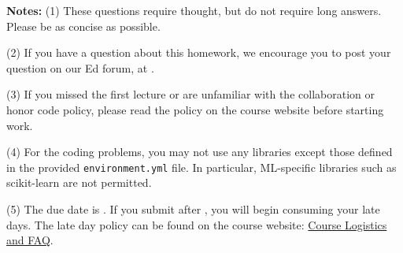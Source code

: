 {\bf Notes:} 
(1) These questions require thought, but do not require long
answers. Please be as concise as possible.  

(2) If you have a question
about this homework, we encourage you to post your question on our
Ed forum, at \edstem. 

(3) If you
missed the first lecture or are unfamiliar with the collaboration or honor
code policy, please read the policy on the course website before starting work.

(4) For the coding problems, you may not
use any libraries except those defined in the provided \texttt{environment.yml}
file. In particular, ML-specific libraries such as scikit-learn are not
permitted. 

(5) The due date is \due. If you submit after
\due, you will begin consuming your
late days. The late day policy can be found on the course website:  \href{https://docs.google.com/document/d/1_43qRRoHO4CUMHrbDAJlJpU4In08kJJg/edit#heading=h.gjdgxs}{Course Logistics and FAQ}.

